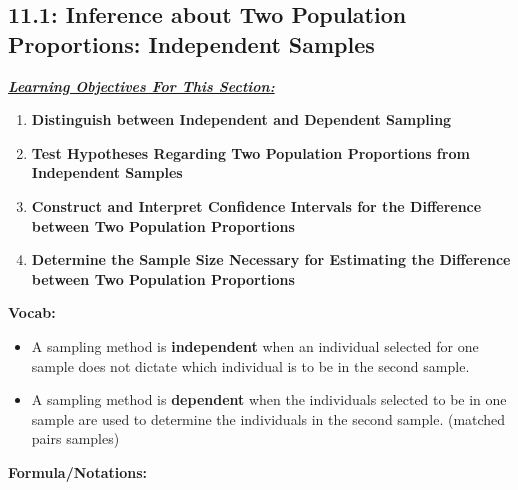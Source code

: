 \documentclass{report}
\begin{document}
    \pagebreak 
    \subsection*{11.1: Inference about Two Population Proportions: Independent Samples}
    \bigbreak \noindent 
    \bigbreak \noindent 
    \textbf{\textit{\underline{Learning Objectives For This Section:}}}
    \begin{enumerate}
        \item \textbf{Distinguish between Independent and Dependent Sampling}
        \item \textbf{Test Hypotheses Regarding Two Population Proportions from Independent Samples}
        \item \textbf{Construct and Interpret Confidence Intervals for the Difference between Two Population Proportions}
        \item \textbf{Determine the Sample Size Necessary for Estimating the Difference between Two Population Proportions}
    \end{enumerate}
    \bigbreak \noindent 
    \textbf{Vocab:}
    \begin{itemize}
        \item A sampling method is \textbf{independent} when an individual selected for one sample does not dictate which individual is to be in the second sample.
        \item A sampling method is \textbf{dependent} when the individuals selected to be in one sample are used to determine the individuals in the second sample. (matched pairs samples)
    \end{itemize}
    \pagebreak \bigbreak \noindent 
    \textbf{Formula/Notations:}
\end{document}
